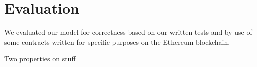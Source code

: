 \section{Evaluation}
We evaluated our model for correctness based on our written tests and by use of
some contracts written for specific purposes on the Ethereum blockchain.

Two properties on stuff
